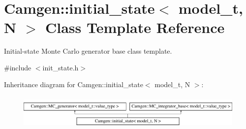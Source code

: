 \hypertarget{a00308}{}\section{Camgen\+:\+:initial\+\_\+state$<$ model\+\_\+t, N $>$ Class Template Reference}
\label{a00308}


Initial-\/state Monte Carlo generator base class template.  




{\ttfamily \#include $<$init\+\_\+state.\+h$>$}

Inheritance diagram for Camgen\+:\+:initial\+\_\+state$<$ model\+\_\+t, N $>$\+:\begin{figure}[H]
\begin{center}
\leavevmode
\includegraphics[height=1.739130cm]{a00308}
\end{center}
\end{figure}
